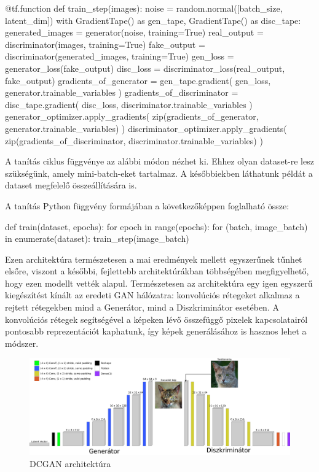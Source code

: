 \begin{python}
@tf.function
def train_step(images):
    noise = random.normal([batch_size, latent_dim])
    with GradientTape() as gen_tape, GradientTape() as disc_tape:
        generated_images = generator(noise, training=True)
        real_output = discriminator(images, training=True)
        fake_output = discriminator(generated_images, training=True)
        gen_loss = generator_loss(fake_output)
        disc_loss = discriminator_loss(real_output, fake_output)
    gradients_of_generator = gen_tape.gradient(
        gen_loss, generator.trainable_variables
    )
    gradients_of_discriminator = disc_tape.gradient(
        disc_loss, discriminator.trainable_variables
    )
    generator_optimizer.apply_gradients(
        zip(gradients_of_generator,
        generator.trainable_variables)
    )
    discriminator_optimizer.apply_gradients(
        zip(gradients_of_discriminator,
        discriminator.trainable_variables)
    )
\end{python}

A tanítás ciklus függvénye az alábbi módon nézhet ki. Ehhez olyan dataset-re lesz szükségünk, amely mini-batch-eket tartalmaz. A későbbiekben láthatunk példát a dataset megfelelő összeállítására is.


A tanítás Python függvény formájában a következőképpen foglalható össze:
\begin{python}
def train(dataset, epochs):
    for epoch in range(epochs):
        for (batch, image_batch) in enumerate(dataset):
            train_step(image_batch)
\end{python}


Ezen architektúra természetesen a mai eredmények mellett egyszerűnek tűnhet elsőre, viszont a későbbi, fejlettebb architektúrákban többségében megfigyelhető, hogy ezen modellt vették alapul. Természetesen az architektúra egy igen egyszerű kiegészítést kínált az eredeti GAN hálózatra: konvolúciós rétegeket alkalmaz a rejtett rétegekben mind a Generátor, mind a Diszkriminátor esetében. A konvolúciós rétegek segítségével a képeken lévő összefüggő pixelek kapcsolatairól pontosabb reprezentációt kaphatunk, így képek generálásához is hasznos lehet a módszer.

\begin{figure}[h]
\centering
\includegraphics[width=15cm]{images/DCGAN.png}
\caption{DCGAN architektúra}
\label{fig:dcgan}
\end{figure}

